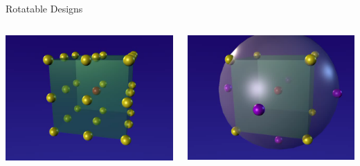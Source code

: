 \documentclass[14pt]{beamer}
\begin{document}
\begin{frame}{Rotatable Designs}
\begin{columns}
    \begin{column}{0.5\textwidth}
      \includegraphics[width=1.1\textwidth]{3level3factor3D.png}
    \end{column}
    \begin{column}{0.5\textwidth}
      \includegraphics[width=1.1\textwidth]{3level3factorCCI3D.png}
    \end{column}
  \end{columns}
\end{frame}
\end{document}
